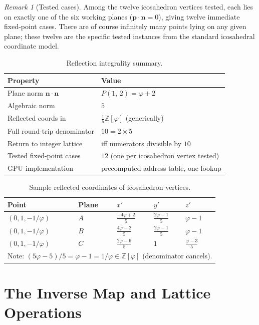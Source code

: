 \documentclass[12pt]{article}
\theoremstyle{definition}
\theoremstyle{remark}
\newtheorem{remark}[theorem]{Remark}
\newcommand{\Zphi}{\mathbb{Z}[\varphi]}
\newcommand{\Phib}[2]{P(#1,\,#2)}
\begin{document}
\begin{remark}[Tested cases]
Among the twelve icosahedron vertices tested, each lies on exactly
one of the six working planes ($\mathbf{p}\cdot\mathbf{n}=0$),
giving twelve immediate fixed-point cases.  There are of course
infinitely many points lying on any given plane; these twelve are
the specific tested instances from the standard icosahedral coordinate
model.
\end{remark}
\begin{table}[h]
\centering
\caption{Reflection integrality summary.}
\label{tab:reflsummary}
\begin{tabular}{ll}
\toprule
Property & Value \\
\midrule
Plane norm $\mathbf{n}\cdot\mathbf{n}$ & $\Phib{1}{2}=\varphi+2$ \\
Algebraic norm & $5$ \\
Reflected coords in & $\tfrac{1}{5}\Zphi$ (generically) \\
Full round-trip denominator & $10=2\times5$ \\
Return to integer lattice & iff numerators divisible by $10$ \\
Tested fixed-point cases & $12$ (one per icosahedron vertex tested) \\
GPU implementation & precomputed address table, one lookup \\
\bottomrule
\end{tabular}
\end{table}
\begin{table}[h]
\centering
\caption{Sample reflected coordinates of icosahedron vertices.}
\label{tab:reflect}
\begin{tabular}{lllll}
\toprule
Point & Plane & $x'$ & $y'$ & $z'$ \\
\midrule
$(0,1,-1/\varphi)$ & $A$ &
  $\frac{-4\varphi+2}{5}$ & $\frac{2\varphi-1}{5}$ & $\varphi-1$ \\[4pt]
$(0,1,-1/\varphi)$ & $B$ &
  $\frac{4\varphi-2}{5}$  & $\frac{2\varphi-1}{5}$ & $\varphi-1$ \\[4pt]
$(0,1,-1/\varphi)$ & $C$ &
  $\frac{2\varphi-6}{5}$  & $1$                    & $\frac{\varphi-3}{5}$ \\
\bottomrule
\multicolumn{5}{l}{\small Note: $(5\varphi-5)/5=\varphi-1=1/\varphi\in\Zphi$
  (denominator cancels).}
\end{tabular}
\end{table}
\section{The Inverse Map and Lattice Operations}
\label{sec:inverse}
\end{document}
